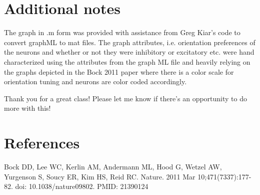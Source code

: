 \documentclass[12pt]{article}
\begin{document}
\section*{Additional notes}
The graph in .m form was provided with assistance from Greg Kiar's code to convert graphML to mat files. The graph attributes, i.e. orientation preferences of the neurons and whether or not they were inhibitory or excitatory etc. were hand characterized using the attributes from the graph ML file and heavily relying on the graphs depicted in the Bock 2011 paper where there is a color scale for orientation tuning and neurons are color coded accordingly. 

\newpage

Thank you for a great class! Please let me know if there's an opportunity to do more with this!
\section*{References}

Bock DD, Lee WC, Kerlin AM, Andermann ML, Hood G, Wetzel AW, Yurgenson S, Soucy ER, Kim HS, Reid RC.
Nature. 2011 Mar 10;471(7337):177-82. doi: 10.1038/nature09802.
PMID: 21390124
\end{document}
